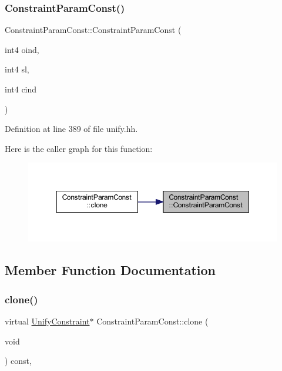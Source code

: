 \subsubsection{\texorpdfstring{ConstraintParamConst()}{ConstraintParamConst()}}
{\footnotesize\ttfamily Constraint\+Param\+Const\+::\+Constraint\+Param\+Const (\begin{DoxyParamCaption}\item[{int4}]{oind,  }\item[{int4}]{sl,  }\item[{int4}]{cind }\end{DoxyParamCaption})\hspace{0.3cm}{\ttfamily [inline]}}



Definition at line 389 of file unify.\+hh.

Here is the caller graph for this function\+:
\nopagebreak
\begin{figure}[H]
\begin{center}
\leavevmode
\includegraphics[width=350pt]{class_constraint_param_const_a1383b55ae78cfb5750aebad574ec6c38_icgraph}
\end{center}
\end{figure}


\subsection{Member Function Documentation}
\mbox{\label{class_constraint_param_const_abcdd802e7100afb44698c156aec6e3a5}} 
\subsubsection{\texorpdfstring{clone()}{clone()}}
{\footnotesize\ttfamily virtual \mbox{\hyperlink{class_unify_constraint}{Unify\+Constraint}}$\ast$ Constraint\+Param\+Const\+::clone (\begin{DoxyParamCaption}\item[{void}]{ }\end{DoxyParamCaption}) const\hspace{0.3cm}{\ttfamily [inline]}, {\ttfamily [virtual]}}



